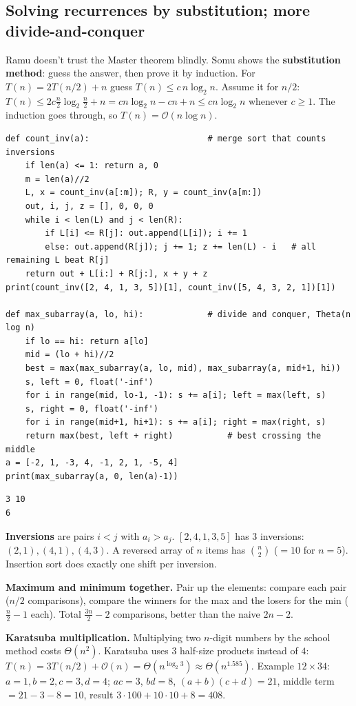 \documentclass[11pt,a4paper]{article}
\newcommand{\Oh}{\mathcal{O}}
\begin{document}
\subsection{Solving recurrences by substitution; more divide-and-conquer}
\begin{story}
Ramu doesn't trust the Master theorem blindly. Somu shows the \textbf{substitution method}: guess the answer, then prove it by induction. For $T(n)=2T(n/2)+n$ guess $T(n)\le c\,n\log_2 n$. Assume it for $n/2$: $T(n)\le 2c\frac n2\log_2\frac n2+n=cn\log_2 n-cn+n\le cn\log_2 n$ whenever $c\ge1$. The induction goes through, so $T(n)=\Oh(n\log n)$.
\end{story}
\begin{lstlisting}
def count_inv(a):                        # merge sort that counts inversions
    if len(a) <= 1: return a, 0
    m = len(a)//2
    L, x = count_inv(a[:m]); R, y = count_inv(a[m:])
    out, i, j, z = [], 0, 0, 0
    while i < len(L) and j < len(R):
        if L[i] <= R[j]: out.append(L[i]); i += 1
        else: out.append(R[j]); j += 1; z += len(L) - i   # all remaining L beat R[j]
    return out + L[i:] + R[j:], x + y + z
print(count_inv([2, 4, 1, 3, 5])[1], count_inv([5, 4, 3, 2, 1])[1])

def max_subarray(a, lo, hi):             # divide and conquer, Theta(n log n)
    if lo == hi: return a[lo]
    mid = (lo + hi)//2
    best = max(max_subarray(a, lo, mid), max_subarray(a, mid+1, hi))
    s, left = 0, float('-inf')
    for i in range(mid, lo-1, -1): s += a[i]; left = max(left, s)
    s, right = 0, float('-inf')
    for i in range(mid+1, hi+1): s += a[i]; right = max(right, s)
    return max(best, left + right)           # best crossing the middle
a = [-2, 1, -3, 4, -1, 2, 1, -5, 4]
print(max_subarray(a, 0, len(a)-1))
\end{lstlisting}
\begin{lstlisting}[style=out]
3 10
6
\end{lstlisting}
\textbf{Inversions} are pairs $i<j$ with $a_i>a_j$. $[2,4,1,3,5]$ has $3$ inversions: $(2,1),(4,1),(4,3)$. A reversed array of $n$ items has $\binom n2$ ($=10$ for $n=5$). Insertion sort does exactly one shift per inversion.

\textbf{Maximum and minimum together.} Pair up the elements: compare each pair ($n/2$ comparisons), compare the winners for the max and the losers for the min ($\frac n2-1$ each). Total $\frac{3n}{2}-2$ comparisons, better than the naive $2n-2$.

\textbf{Karatsuba multiplication.} Multiplying two $n$-digit numbers by the school method costs $\Theta(n^2)$. Karatsuba uses $3$ half-size products instead of $4$: $T(n)=3T(n/2)+\Oh(n)=\Theta(n^{\log_2 3})\approx\Theta(n^{1.585})$. Example $12\times34$: $a=1,b=2,c=3,d=4$; $ac=3$, $bd=8$, $(a+b)(c+d)=21$, middle term $=21-3-8=10$, result $3\cdot100+10\cdot10+8=408$.
\end{document}
